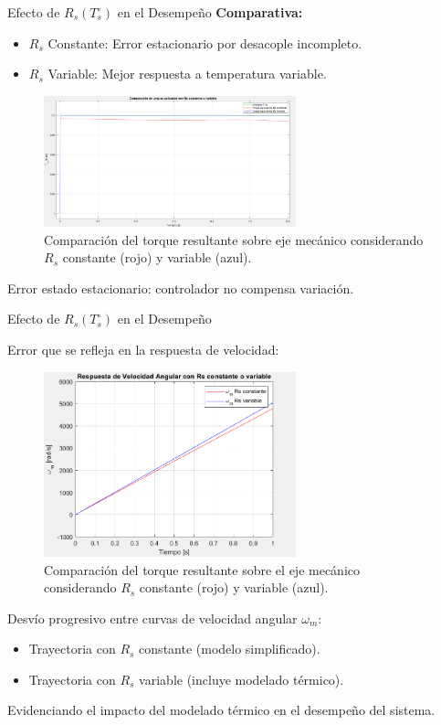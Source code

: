 \documentclass[12pt]{beamer}
\begin{document}
\begin{frame}{Efecto de \(R_s(T_s^\circ)\) en el Desempeño} 
\textbf{Comparativa:}
\begin{itemize}
    \item \(R_s\) Constante: Error estacionario por desacople incompleto.
    \item \(R_s\) Variable: Mejor respuesta a temperatura variable.
\end{itemize}

\begin{figure}[h]
    \centering
    \includegraphics[width=0.65\textwidth]{Imagenes/ComparacionModuladorTorqueRs.png}
    \caption{Comparación del torque resultante sobre eje mecánico considerando \(R_s\) constante (rojo) y variable (azul).}
\end{figure}
Error estado estacionario: controlador no compensa variación. 
\end{frame}


\begin{frame}{Efecto de \(R_s(T_s^\circ)\) en el Desempeño}

Error que se refleja en la respuesta de velocidad:
\begin{figure}[h]
    \centering
    \includegraphics[width=0.65\textwidth]{Imagenes/ComparacionVelocidadModuladorRs.png}
    \caption{Comparación del torque resultante sobre el eje mecánico considerando \(R_s\) constante (rojo) y variable (azul).}
\end{figure}

Desvío progresivo entre curvas de velocidad angular \(\omega_m\):
\begin{itemize}
    \item Trayectoria con \(R_s\) constante (modelo simplificado).
    \item Trayectoria con \(R_s\) variable (incluye modelado térmico).
\end{itemize}

\medskip
Evidenciando el impacto del modelado térmico en el desempeño del sistema.
    
\end{frame}
\end{document}
